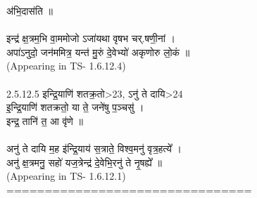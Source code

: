 \documentclass[17pt]{extarticle}
\begin{document}
अ॑भि॒दास॑ति ॥\\\\इन्द्र॑ क्ष॒त्रम॒भि वा॒ममोजो ऽजा॑यथा वृषभ चर्.षणी॒नां । \\अपा॑ऽनुदो॒ जन॑ममित्र॒ यन्त॑ मु॒रुं दे॒वेभ्यो॑ अकृणोरु लो॒कं ॥ \\(Appearing in TS- 1.6.12.4)\\\\2.5.12.5 इन्द्रि॒याणि॑ शतक्र॒तो>23, ऽनु॑ ते दायि>24\\इ॒न्द्रि॒याणि॑ शतक्रतो॒ या ते॒ जने॑षु प॒ञ्चसु॑ । \\इन्द्र॒ तानि॑ त॒ आ वृ॑णे ॥\\\\अनु॑ ते दायि म॒ह इ॑न्द्रि॒याय॑ स॒त्राते॒ विश्व॒मनु॑ वृत्र॒हत्ये᳚ । \\अनु॑ क्ष॒त्रमनु॒ सहो॑ यज॒त्रेन्द्र॑ दे॒वेभि॒रनु॑ ते नृ॒षह्ये᳚ ॥ \\(Appearing in TS- 1.6.12.1)\\================================\\
\pagebreak
        
\end{document}
